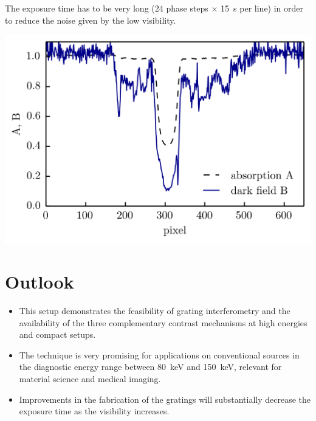\documentclass[a0,portrait]{a0poster}
\newenvironment{spacedcenter}{\vspace{2cm}\begin{center}}
        {\end{center}\vspace{2cm}\par}
\begin{document}
\begin{multicols}{2}
\begin{spacedcenter}
\end{spacedcenter}
The exposure time has to be very long (\num{24} phase steps $\times$
\SI{15}{\second} per line) in order to reduce the noise given by the low visibility.
\begin{spacedcenter}
    \includegraphics[width=0.6\linewidth]{profile_S00613.png}
\end{spacedcenter}
\color{Navy} 

\section*{Outlook}
\begin{itemize}
    \item This setup demonstrates the feasibility of grating interferometry
        and the availability of the three complementary contrast mechanisms
        at high energies and compact setups.
    \item The technique is very promising for applications on
        conventional sources in the diagnostic energy range between
        \SI{80}{\kilo\eV} and \SI{150}{\kilo\eV}, relevant for material
        science and medical imaging.
    \item Improvements in the fabrication of the gratings will substantially
        decrease the exposure time as the visibility increases.
\end{itemize}

\color{DarkSlateGray} %


\end{multicols}
\end{document}
